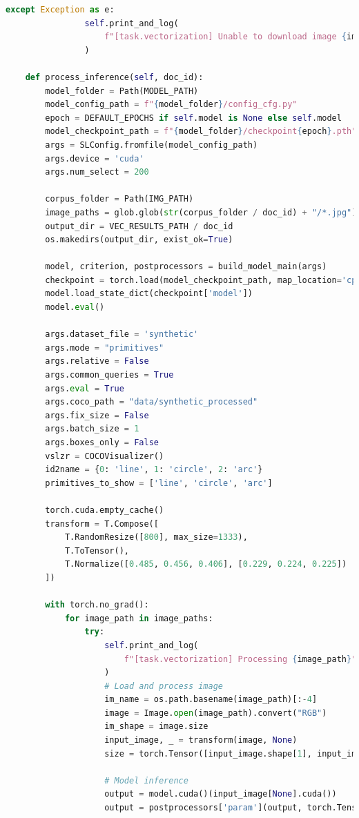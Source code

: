 \begin{lstlisting}[language=python, frame=single, breaklines=true, caption={Classe \texttt{ComputeVectorization}.}]
            except Exception as e:
                self.print_and_log(
                    f"[task.vectorization] Unable to download image {image_id}", e
                )

    def process_inference(self, doc_id):
        model_folder = Path(MODEL_PATH) 
        model_config_path = f"{model_folder}/config_cfg.py" 
        epoch = DEFAULT_EPOCHS if self.model is None else self.model
        model_checkpoint_path = f"{model_folder}/checkpoint{epoch}.pth"
        args = SLConfig.fromfile(model_config_path)
        args.device = 'cuda'
        args.num_select = 200

        corpus_folder = Path(IMG_PATH)
        image_paths = glob.glob(str(corpus_folder / doc_id) + "/*.jpg")
        output_dir = VEC_RESULTS_PATH / doc_id
        os.makedirs(output_dir, exist_ok=True)

        model, criterion, postprocessors = build_model_main(args)
        checkpoint = torch.load(model_checkpoint_path, map_location='cpu')
        model.load_state_dict(checkpoint['model'])
        model.eval()

        args.dataset_file = 'synthetic'
        args.mode = "primitives"
        args.relative = False
        args.common_queries = True
        args.eval = True
        args.coco_path = "data/synthetic_processed"
        args.fix_size = False
        args.batch_size = 1
        args.boxes_only = False
        vslzr = COCOVisualizer()
        id2name = {0: 'line', 1: 'circle', 2: 'arc'}
        primitives_to_show = ['line', 'circle', 'arc']

        torch.cuda.empty_cache()
        transform = T.Compose([
            T.RandomResize([800], max_size=1333),
            T.ToTensor(),
            T.Normalize([0.485, 0.456, 0.406], [0.229, 0.224, 0.225])
        ])

        with torch.no_grad():
            for image_path in image_paths:
                try:
                    self.print_and_log(
                        f"[task.vectorization] Processing {image_path}", color="blue"
                    )
                    # Load and process image
                    im_name = os.path.basename(image_path)[:-4]
                    image = Image.open(image_path).convert("RGB")
                    im_shape = image.size
                    input_image, _ = transform(image, None)
                    size = torch.Tensor([input_image.shape[1], input_image.shape[2]])

                    # Model inference
                    output = model.cuda()(input_image[None].cuda())
                    output = postprocessors['param'](output, torch.Tensor([[im_shape[1], im_shape[0]]]).cuda(), to_xyxy=False)[0]


\end{lstlisting}

